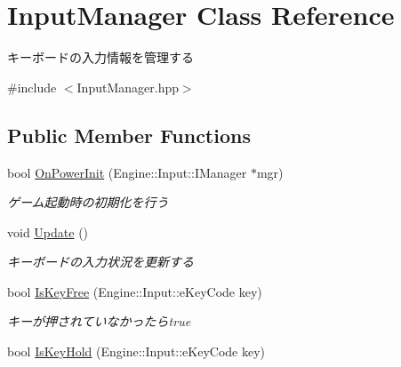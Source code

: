 \hypertarget{class_input_manager}{}\section{Input\+Manager Class Reference}
\label{class_input_manager}


キーボードの入力情報を管理する  




{\ttfamily \#include $<$Input\+Manager.\+hpp$>$}

\subsection*{Public Member Functions}
\begin{DoxyCompactItemize}
\item 
bool \hyperlink{class_input_manager_a9b808236f2b417d11aa255c03c7e21d7}{On\+Power\+Init} (Engine\+::\+Input\+::\+I\+Manager $\ast$mgr)\hypertarget{class_input_manager_a9b808236f2b417d11aa255c03c7e21d7}{}\label{class_input_manager_a9b808236f2b417d11aa255c03c7e21d7}

\begin{DoxyCompactList}\small\item\em ゲーム起動時の初期化を行う \end{DoxyCompactList}\item 
void \hyperlink{class_input_manager_aa5480931dba2720e7d80dd00a53adae0}{Update} ()\hypertarget{class_input_manager_aa5480931dba2720e7d80dd00a53adae0}{}\label{class_input_manager_aa5480931dba2720e7d80dd00a53adae0}

\begin{DoxyCompactList}\small\item\em キーボードの入力状況を更新する \end{DoxyCompactList}\item 
bool \hyperlink{class_input_manager_aefb7ea8dab0e99d26257b86e7ef98324}{Is\+Key\+Free} (Engine\+::\+Input\+::e\+Key\+Code key)\hypertarget{class_input_manager_aefb7ea8dab0e99d26257b86e7ef98324}{}\label{class_input_manager_aefb7ea8dab0e99d26257b86e7ef98324}

\begin{DoxyCompactList}\small\item\em キーが押されていなかったらtrue \end{DoxyCompactList}\item 
bool \hyperlink{class_input_manager_a25b4a91cf685997cf63d19262d2020ab}{Is\+Key\+Hold} (Engine\+::\+Input\+::e\+Key\+Code key)\hypertarget{class_input_manager_a25b4a91cf685997cf63d19262d2020ab}{}\label{class_input_manager_a25b4a91cf685997cf63d19262d2020ab}


\end{DoxyCompactItemize}
